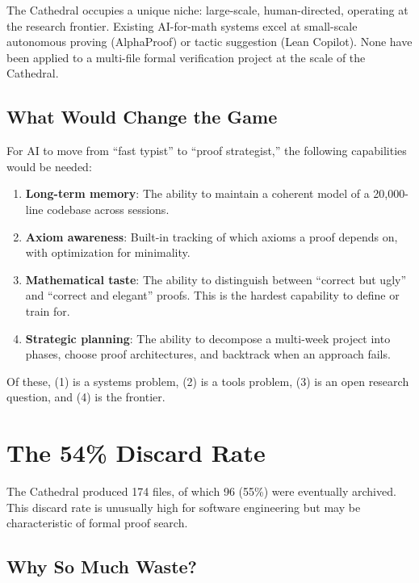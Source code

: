 \documentclass[11pt,a4paper]{article}
\begin{document}
The Cathedral occupies a unique niche: large-scale, human-directed,
operating at the research frontier. Existing AI-for-math systems
excel at small-scale autonomous proving (AlphaProof) or tactic
suggestion (Lean Copilot). None have been applied to a multi-file
formal verification project at the scale of the Cathedral.

\subsection{What Would Change the Game}

For AI to move from ``fast typist'' to ``proof strategist,'' the
following capabilities would be needed:

\begin{enumerate}
  \item \textbf{Long-term memory}: The ability to maintain a coherent
    model of a 20,000-line codebase across sessions.
  \item \textbf{Axiom awareness}: Built-in tracking of which axioms
    a proof depends on, with optimization for minimality.
  \item \textbf{Mathematical taste}: The ability to distinguish
    between ``correct but ugly'' and ``correct and elegant'' proofs.
    This is the hardest capability to define or train for.
  \item \textbf{Strategic planning}: The ability to decompose a
    multi-week project into phases, choose proof architectures, and
    backtrack when an approach fails.
\end{enumerate}

Of these, (1) is a systems problem, (2) is a tools problem, (3) is
an open research question, and (4) is the frontier.

\section{The 54\% Discard Rate}
\label{sec:discard}

The Cathedral produced 174 files, of which 96 (55\%) were eventually
archived. This discard rate is unusually high for software engineering
but may be characteristic of formal proof search.

\subsection{Why So Much Waste?}
\end{document}
